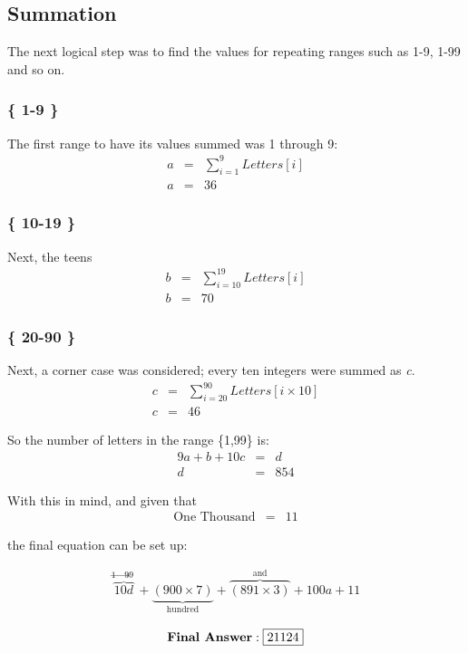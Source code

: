 \documentclass{article}
\begin{document}
\subsection{Summation}
The next logical step was to find the values for repeating ranges such as 1-9,
1-99 and so on. 

\subsubsection{\{ 1-9 \}}
The first range to have its values summed was 1 through 9:
\begin{eqnarray*}
  a &=& \sum_{i=1}^{9} Letters[i]\\
  a &=& \boxed{36}
  \label{1thru9}
\end{eqnarray*}

\subsubsection{ \{ 10-19 \} }
Next, the teens
\begin{eqnarray*}
  b &=& \sum_{i=10}^{19} Letters[i]\\
  b &=& \boxed{70}
  \label{10thru19}
\end{eqnarray*}

\subsubsection{\{ 20-90 \}}
Next, a corner case was considered; every ten integers were summed as \emph{c}.
\begin{eqnarray*}
  c &=& \sum_{i=20}^{90} Letters[i\times10]\\
  c &=& \boxed{46}
  \label{20thru90}
\end{eqnarray*}

So the number of letters in the range \{1,99\} is:
\begin{eqnarray*}
  9a+b+10c &=& d\\ 
  d &=&\boxed{854} 
  \label{1thru99sum}
\end{eqnarray*}

With this in mind, and given that 
\begin{eqnarray*}
  \text{One Thousand} &=& \boxed{11}
\end{eqnarray*}

the final equation can be set up:

\begin{eqnarray*}
  \overbrace{10d}^{\text{1$\to$99 }} +
  \underbrace{(900 \times 7)}_{\text{hundred}} +
  \overbrace{(891\times3)}^{\text{and}}+
  100a+11\\
\end{eqnarray*}                   
\begin{eqnarray*}
  \text{\bf{Final Answer}}: \boxed{21124}
\end{eqnarray*}                   
\end{document}
